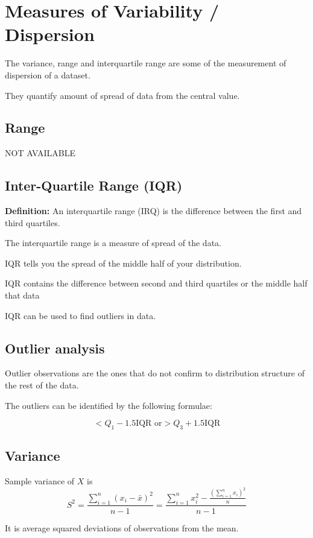 \documentclass[12pt]{article}
\begin{document}
\section{Measures of Variability / Dispersion}%
The variance, range and interquartile range are some of the measurement of dispersion of a dataset.

They quantify amount of spread of data from the central value.
\subsection{Range}
NOT AVAILABLE
\subsection{Inter-Quartile Range (IQR)}
\textbf{Definition:} An interquartile range (IRQ) is the difference between the first and third quartiles.

The interquartile range is a measure of spread of the data.

IQR tells you the spread of the middle half of your distribution.

IQR contains the {difference between} second and third quartiles  or the middle half that data

IQR can be used to find outliers in data.

\subsection{Outlier analysis}

Outlier observations are the ones that do not confirm to distribution structure of the rest of the data.

The outliers can be identified by the following formulae:

\begin{equation}
    < Q_1 - 1.5\text{IQR or} > Q_3 + 1.5\text{IQR}
\end{equation}
\subsection{Variance}
Sample variance of $X$ is
\begin{equation}
    S^2 = \frac{\sum_{i = 1}^{n}(x_i - \bar{x})^2}{n - 1} = \frac{\sum_{i = 1}^{n} x_i^2 - \frac{(\sum_{i = 1}^{n}x_i)^2}{n}}{n-1}
\end{equation}

It is average squared deviations of observations from the mean.
\end{document}
